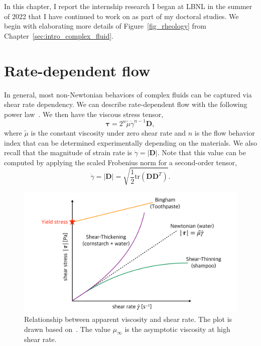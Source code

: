 \par
In this chapter, I report the internship research I began at LBNL in the summer of 2022 that I have continued to work on as part of my doctoral studies.
We begin with elaborating more details of Figure~\ref{fig_rheology} from Chapter~\ref{sec:intro_complex_fluid}. 

\section{Rate-dependent flow}
In general, most non-Newtonian behaviors of complex fluids can be captured via shear rate dependency. 
We can describe rate-dependent flow with the following power law~\cite{herschel_konsistenzmessungen_1926}. We then have the viscous stress tensor, 
\begin{equation}
  {\bm \tau}
  =2^n \tilde{\mu} \dot{\gamma} ^{n-1} {\bm D},
  \label{eq_HS_tau}
  \end{equation}
where $\tilde{\mu}$ is the constant viscosity under zero shear rate and $n$ is the flow behavior index that can be determined experimentally depending on the materials.
We also recall that the magnitude of strain rate is $\dot{\gamma} = |\bm{D}|$.
Note that this value can be computed by applying the scaled Frobenius norm for a second-order tensor, 
\[
  \dot{\gamma}  = |\bm{D}| = \sqrt{\frac{1}{2}
    \text{tr}\left(\bm{D} \bm{D}^{T} \right)}.
\]
\begin{figure}[ht]
  \begin{center}
    \includegraphics[scale=0.19]{figures/fig_appr_viscosity.pdf}
    \end{center}
  \caption{Relationship between apparent viscosity and shear rate. The plot is drawn based on~\cite{irgens_rheology_2014}. The value $\mu_{\infty}$ is the asymptotic viscosity at high shear rate.}
  \label{fig_appr_viscosity}
\end{figure}
